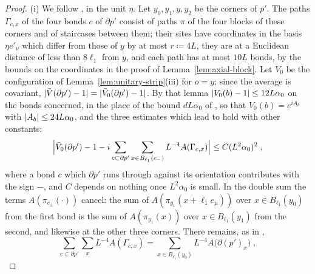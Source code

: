 \documentclass[11pt]{preprint}
\DeclarePairedDelimiter{\abs}{\lvert}{\rvert}
\numberwithin{equation}{section}
\theoremstyle{definition}
\theoremstyle{remark}
\theoremstyle{plain}
\begin{document}
\begin{proof}
(i) We follow \cite[(44)--(50), pp.~24--25]{BalabanAVG}, in the unit $\eta$. Let $y_0, y_1, y, y_2$ be the corners of $p'$. The paths $\Gamma_{c,x}$ of the four bonds $c$ of $\partial p'$ consist of paths $\pi$ of the four blocks of these corners and of staircases between them; their sites have coordinates in the basis $\eta e'_\nu$ which differ from those of $y$ by at most $r \coloneqq 4L$, they are at a Euclidean distance of less than $8\ell_1$ from $y$, and each path has at most $10L$ bonds, by the bounds on the coordinates in the proof of Lemma~\ref{lem:axial-block}. Let $V_0$ be the configuration of Lemma~\ref{lem:unitary-strip}(iii) for $o = y$; since the average is covariant, $\abs{\bar V(\partial p') - 1} = \abs{\bar V_0(\partial p') - 1}$. By that lemma $\abs{V_0(b) - 1} \leq 12L\alpha_0$ on the bonds concerned, in the place of the bound $dL\alpha_0$ of \cite[p.~25]{BalabanAVG}, so that $V_0(b) = e^{iA_b}$ with $\abs{A_b} \leq 24L\alpha_0$, and the three estimates which lead to \cite[(47)]{BalabanAVG} hold with other constants:
\begin{equation}\label{eq:averaging-linearisation}
    \Bigl\lvert\bar V_0(\partial p') - 1 - i\sum_{c \subset \partial p'}\sum_{x \in B_{\ell_1}(c_-)}L^{-4}A(\Gamma_{c,x})\Bigr\rvert \leq C(L^2\alpha_0)^2\;,
\end{equation}
where a bond $c$ which $\partial p'$ runs through against its orientation contributes with the sign $-$, and $C$ depends on nothing once $L^2\alpha_0$ is small. In the double sum the terms $A(\pi_{c_\pm}(\cdot))$ cancel: the sum of $A(\pi_{y_1}(x + \ell_1e_\mu))$ over $x \in B_{\ell_1}(y_0)$ from the first bond is the sum of $A(\pi_{y_1}(x))$ over $x \in B_{\ell_1}(y_1)$ from the second, and likewise at the other three corners. There remains, as in \cite[(48)]{BalabanAVG},
\begin{equation}\label{eq:averaging-plaquette-sum}
    \sum_{c \subset \partial p'}\sum_xL^{-4}A(\Gamma_{c,x}) = \sum_{x \in B_{\ell_1}(y_0)}L^{-4}A\bigl(\partial(p')_x\bigr)\;,
\end{equation}

\end{proof}
\end{document}
